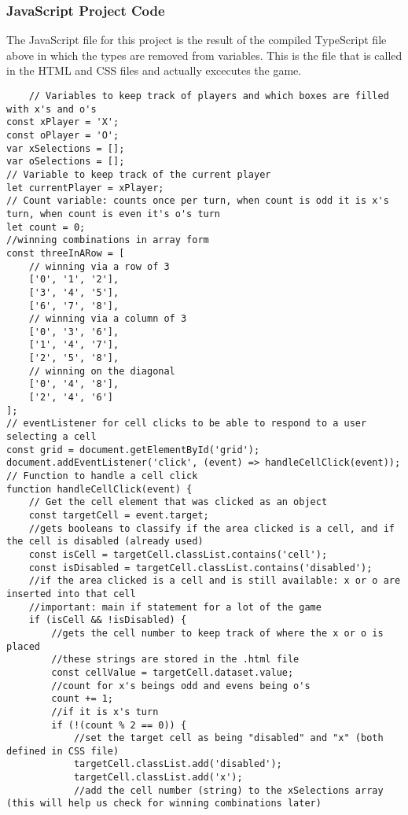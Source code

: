 \documentclass{article}
\theoremstyle{theorem}
\theoremstyle{definition}
\theoremstyle{remark}
\begin{document}
\subsubsection{JavaScript Project Code}
The JavaScript file for this project is the result of the compiled TypeScript file above in which the types are removed from variables. This is the file that is called in the HTML and CSS files and actually excecutes the game.

\begin{lstlisting}
    // Variables to keep track of players and which boxes are filled with x's and o's
const xPlayer = 'X';
const oPlayer = 'O';
var xSelections = [];
var oSelections = [];
// Variable to keep track of the current player
let currentPlayer = xPlayer;
// Count variable: counts once per turn, when count is odd it is x's turn, when count is even it's o's turn
let count = 0;
//winning combinations in array form
const threeInARow = [
    // winning via a row of 3
    ['0', '1', '2'],
    ['3', '4', '5'],
    ['6', '7', '8'],
    // winning via a column of 3
    ['0', '3', '6'],
    ['1', '4', '7'],
    ['2', '5', '8'],
    // winning on the diagonal
    ['0', '4', '8'],
    ['2', '4', '6']
];
// eventListener for cell clicks to be able to respond to a user selecting a cell
const grid = document.getElementById('grid');
document.addEventListener('click', (event) => handleCellClick(event));
// Function to handle a cell click
function handleCellClick(event) {
    // Get the cell element that was clicked as an object
    const targetCell = event.target;
    //gets booleans to classify if the area clicked is a cell, and if the cell is disabled (already used)
    const isCell = targetCell.classList.contains('cell');
    const isDisabled = targetCell.classList.contains('disabled');
    //if the area clicked is a cell and is still available: x or o are inserted into that cell
    //important: main if statement for a lot of the game
    if (isCell && !isDisabled) {
        //gets the cell number to keep track of where the x or o is placed
        //these strings are stored in the .html file
        const cellValue = targetCell.dataset.value;
        //count for x's beings odd and evens being o's
        count += 1;
        //if it is x's turn
        if (!(count % 2 == 0)) {
            //set the target cell as being "disabled" and "x" (both defined in CSS file)
            targetCell.classList.add('disabled');
            targetCell.classList.add('x');
            //add the cell number (string) to the xSelections array (this will help us check for winning combinations later)

\end{lstlisting}
\end{document}

